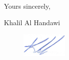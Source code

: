 \documentclass[12pt]{article} %
\begin{document}
\medskip %

Yours sincerely,

\medskip %

Khalil Al Handawi

\begin{figure}[h]
	\includegraphics[width=0.2\textwidth]{Signiture.png}
\end{figure}

\medskip %

\end{document}
